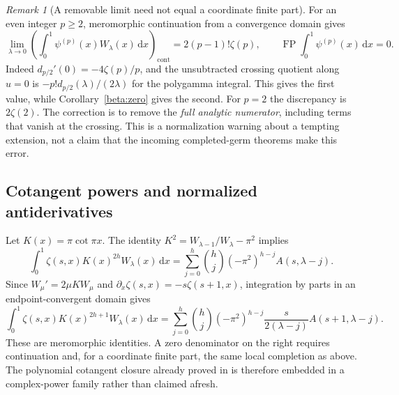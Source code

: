 \documentclass[11pt]{article}
\numberwithin{equation}{section}
\theoremstyle{definition}
\theoremstyle{remark}
\newtheorem{remark}[theorem]{Remark}
\DeclareMathOperator{\FP}{FP}
\newcommand{\dd}{\,\mathrm d}
\begin{document}
\begin{remark}[A removable limit need not equal a coordinate finite part]
\label{beta:anomaly}
For an even integer $p\geq2$, meromorphic continuation from a
convergence domain gives
\begin{equation}\label{beta:anomalyformula}
 \lim_{\lambda\to0}
 \left(\int_0^1\psi^{(p)}(x)W_\lambda(x)\dd x\right)_{\mathrm{cont}}
 =2(p-1)!\zeta(p),
 \qquad
 \FP\int_0^1\psi^{(p)}(x)\dd x=0.
\end{equation}
Indeed $d_{p/2}'(0)=-4\zeta(p)/p$, and the unsubtracted crossing
quotient along $u=0$ is
$-p!d_{p/2}(\lambda)/(2\lambda)$ for the polygamma integral.
This gives the first value, while Corollary~\ref{beta:zero} gives the
second. For $p=2$ the discrepancy is $2\zeta(2)$. The correction is
to remove the \emph{full analytic numerator}, including terms that
vanish at the crossing. This is a normalization warning about a
tempting extension, not a claim that the incoming completed-germ
theorems make this error.
\end{remark}

\subsection{Cotangent powers and normalized antiderivatives}

Let $K(x)=\pi\cot\pi x$. The identity
$K^2=W_{\lambda-1}/W_\lambda-\pi^2$ implies
\begin{equation}\label{beta:evencot}
 \int_0^1\zeta(s,x)K(x)^{2h}W_\lambda(x)\dd x
 =\sum_{j=0}^h\binom hj(-\pi^2)^{h-j}A(s,\lambda-j).
\end{equation}
Since $W_\mu'=2\mu K W_\mu$ and
$\partial_x\zeta(s,x)=-s\zeta(s+1,x)$, integration by parts in
an endpoint-convergent domain gives
\begin{equation}\label{beta:oddcot}
 \int_0^1\zeta(s,x)K(x)^{2h+1}W_\lambda(x)\dd x
 =\sum_{j=0}^h\binom hj(-\pi^2)^{h-j}
   \frac{s}{2(\lambda-j)}A(s+1,\lambda-j).
\end{equation}
These are meromorphic identities. A zero denominator on the right
requires continuation and, for a coordinate finite part, the same
local completion as above. The polynomial cotangent closure already
proved in \cite{RepoExact} is therefore embedded in a complex-power
family rather than claimed afresh.
\end{document}
